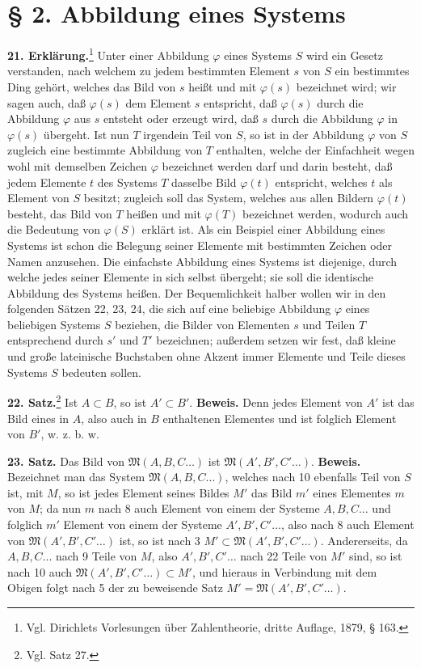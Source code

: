 \documentclass[11pt]{article}
\newcommand{\Mf}{\mathfrak{M}}
\newcommand{\partof}{\mathrel{\subset}}
\begin{document}
\section*{§ 2. Abbildung eines Systems}

\noindent\textbf{21. Erklärung.}\footnote{Vgl. Dirichlets Vorlesungen über Zahlentheorie, dritte Auflage, 1879, § 163.} Unter einer Abbildung $\varphi$ eines Systems $S$ wird ein Gesetz verstanden, nach welchem zu jedem bestimmten Element $s$ von $S$ ein bestimmtes Ding gehört, welches das Bild von $s$ heißt und mit $\varphi(s)$ bezeichnet wird; wir sagen auch, daß $\varphi(s)$ dem Element $s$ entspricht, daß $\varphi(s)$ durch die Abbildung $\varphi$ aus $s$ entsteht oder erzeugt wird, daß $s$ durch die Abbildung $\varphi$ in $\varphi(s)$ übergeht. Ist nun $T$ irgendein Teil von $S$, so ist in der Abbildung $\varphi$ von $S$ zugleich eine bestimmte Abbildung von $T$ enthalten, welche der Einfachheit wegen wohl mit demselben Zeichen $\varphi$ bezeichnet werden darf und darin besteht, daß jedem Elemente $t$ des Systems $T$ dasselbe Bild $\varphi(t)$ entspricht, welches $t$ als Element von $S$ besitzt; zugleich soll das System, welches aus allen Bildern $\varphi(t)$ besteht, das Bild von $T$ heißen und mit $\varphi(T)$ bezeichnet werden, wodurch auch die Bedeutung von $\varphi(S)$ erklärt ist. Als ein Beispiel einer Abbildung eines Systems ist schon die Belegung seiner Elemente mit bestimmten Zeichen oder Namen anzusehen. Die einfachste Abbildung eines Systems ist diejenige, durch welche jedes seiner Elemente in sich selbst übergeht; sie soll die identische Abbildung des Systems heißen. Der Bequemlichkeit halber wollen wir in den folgenden Sätzen 22, 23, 24, die sich auf eine beliebige Abbildung $\varphi$ eines beliebigen Systems $S$ beziehen, die Bilder von Elementen $s$ und Teilen $T$ entsprechend durch $s'$ und $T'$ bezeichnen; außerdem setzen wir fest, daß kleine und große lateinische Buchstaben ohne Akzent immer Elemente und Teile dieses Systems $S$ bedeuten sollen.

\noindent\textbf{22. Satz.}\footnote{Vgl. Satz 27.} Ist $A\partof B$, so ist $A'\partof B'$. \textbf{Beweis.} Denn jedes Element von $A'$ ist das Bild eines in $A$, also auch in $B$ enthaltenen Elementes und ist folglich Element von $B'$, w. z. b. w.

\noindent\textbf{23. Satz.} Das Bild von $\Mf(A,B,C\ldots)$ ist $\Mf(A',B',C'\ldots)$. \textbf{Beweis.} Bezeichnet man das System $\Mf(A,B,C\ldots)$, welches nach 10 ebenfalls Teil von $S$ ist, mit $M$, so ist jedes Element seines Bildes $M'$ das Bild $m'$ eines Elementes $m$ von $M$; da nun $m$ nach 8 auch Element von einem der Systeme $A,B,C\ldots$ und folglich $m'$ Element von einem der Systeme $A',B',C'\ldots$, also nach 8 auch Element von $\Mf(A',B',C'\ldots)$ ist, so ist nach 3 $M'\partof\Mf(A',B',C'\ldots)$. Andererseits, da $A,B,C\ldots$ nach 9 Teile von $M$, also $A',B',C'\ldots$ nach 22 Teile von $M'$ sind, so ist nach 10 auch $\Mf(A',B',C'\ldots)\partof M'$, und hieraus in Verbindung mit dem Obigen folgt nach 5 der zu beweisende Satz $M'=\Mf(A',B',C'\ldots)$.
\end{document}

